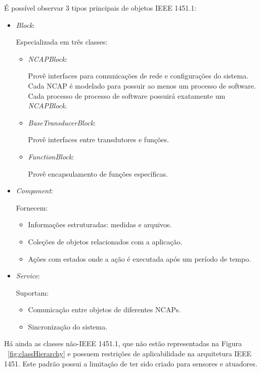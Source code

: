 É possível observar 3 tipos principais de objetos IEEE 1451.1:

\begin{itemize}
	\item\emph{Block}:

	Especializada em três classes:
		\begin{itemize}
			\item\emph{NCAPBlock}:

				Provê interfaces para comunicações de rede e configurações do sistema. Cada NCAP é modelado para possuir ao menos um processo de software. Cada processo de processo de software possuirá exatamente um \emph{NCAPBlock}.
			\item\emph{BaseTransducerBlock}:

				Provê interfaces entre transdutores e funções.
			\item\emph{FunctionBlock}:

				Provê encapsulamento de funções específicas.
		\end{itemize}
	
	\item\emph{Component}:
	
		Fornecem:
		\begin{itemize}
			\item Informações estruturadas: medidas e arquivos.
			\item Coleções de objetos relacionados com a aplicação.
			\item Ações com estados onde a ação é executada após um período de tempo.
		\end{itemize}
	\item\emph{Service}:
	
		Suportam:
		\begin{itemize}
			\item Comunicação entre objetos de diferentes NCAPs.
			\item Sincronização do sistema.
		\end{itemize}
\end{itemize}

Há ainda as classes não-IEEE 1451.1, que não estão representadas na Figura ~\ref{fig:classHierarchy} e possuem restrições de aplicabilidade na arquitetura IEEE 1451. Este padrão possui a limitação de ter sido criado para sensores e atuadores.


